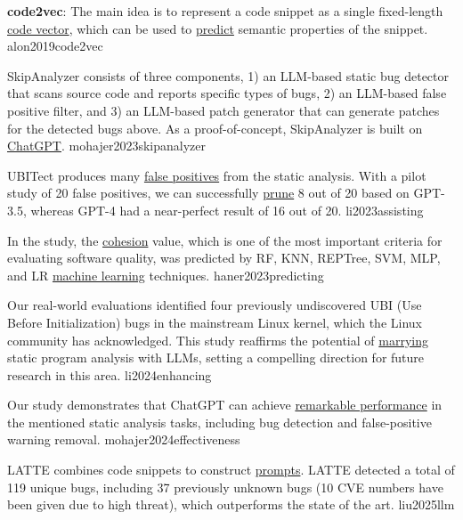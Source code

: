 \documentclass{article}
\begin{document}
  {\textbf{code2vec}: The main idea is to represent a code snippet as a single fixed-length \ul{code vector}, which can be used to \ul{predict} semantic properties of the snippet.}
  {alon2019code2vec}

  {SkipAnalyzer consists of three components, 1) an LLM-based static bug detector that scans source code and reports specific types of bugs, 2) an LLM-based false positive filter, and 3) an LLM-based patch generator that can generate patches for the detected bugs above. As a proof-of-concept, SkipAnalyzer is built on \ul{ChatGPT}.}
  {mohajer2023skipanalyzer}

  {UBITect produces many \ul{false positives} from the static analysis. With a pilot study of 20 false positives, we can successfully \ul{prune} 8 out of 20 based on GPT-3.5, whereas GPT-4 had a near-perfect result of 16 out of 20.}
  {li2023assisting}

  {In the study, the \ul{cohesion} value, which is one of the most important criteria for evaluating software quality, was predicted by RF, KNN, REPTree, SVM, MLP, and LR \ul{machine learning} techniques.}
  {haner2023predicting}


  {Our real-world evaluations identified four previously undiscovered UBI (Use Before Initialization) bugs in the mainstream Linux kernel, which the Linux community has acknowledged. This study reaffirms the potential of \ul{marrying} static program analysis with LLMs, setting a compelling direction for future research in this area.}
  {li2024enhancing}

  {Our study demonstrates that ChatGPT can achieve \ul{remarkable performance} in the mentioned static analysis tasks, including bug detection and false-positive warning removal.}
  {mohajer2024effectiveness}

  {LATTE combines code snippets to construct \ul{prompts}. LATTE detected a total of 119 unique bugs, including 37 previously unknown bugs (10 CVE numbers have been given due to high threat), which outperforms the state of the art.}
  {liu2025llm}
\end{document}
